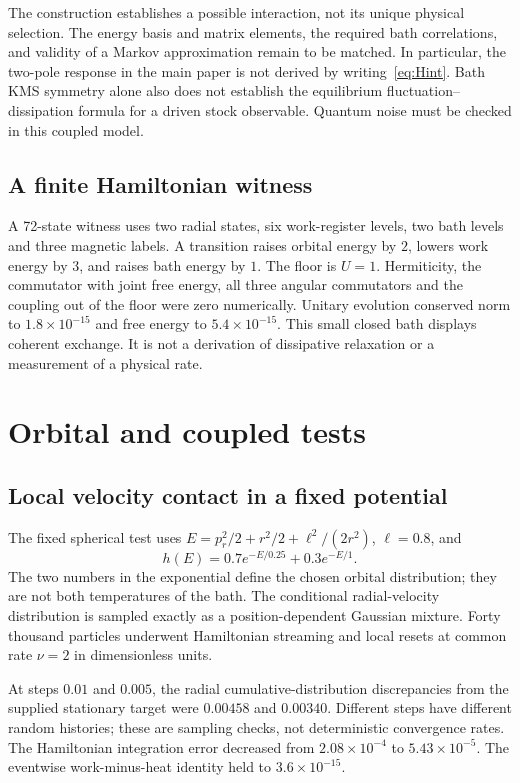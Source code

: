 \documentclass[11pt]{article}
\begin{document}
The construction establishes a possible interaction, not its unique
physical selection. The energy basis and matrix elements, the required
bath correlations, and validity of a Markov approximation remain to be
matched. In particular, the two-pole response in the main paper is not
derived by writing~\eqref{eq:Hint}. Bath KMS symmetry alone also does not
establish the equilibrium fluctuation--dissipation formula for a driven
stock observable. Quantum noise must be checked in this coupled model.

\subsection{A finite Hamiltonian witness}
A 72-state witness uses two radial states, six work-register levels, two
bath levels and three magnetic labels. A transition raises orbital energy
by $2$, lowers work energy by $3$, and raises bath energy by $1$. The
floor is $U=1$. Hermiticity, the commutator with joint free energy, all
three angular commutators and the coupling out of the floor were zero
numerically. Unitary evolution conserved norm to $1.8\times10^{-15}$ and
free energy to $5.4\times10^{-15}$.
This small closed bath displays coherent exchange. It is not a derivation
of dissipative relaxation or a measurement of a physical rate.

\section{Orbital and coupled tests}
\subsection{Local velocity contact in a fixed potential}
The fixed spherical test uses
$E=p_r^2/2+r^2/2+\ell^2/(2r^2)$, $\ell=0.8$, and
\begin{equation}
 h(E)=0.7e^{-E/0.25}+0.3e^{-E/1}.
\end{equation}
The two numbers in the exponential define the chosen orbital distribution;
they are not both temperatures of the bath. The conditional radial-velocity
distribution is sampled exactly as a position-dependent Gaussian mixture.
Forty thousand particles underwent Hamiltonian streaming and local resets
at common rate $\nu=2$ in dimensionless units.

At steps $0.01$ and $0.005$, the radial cumulative-distribution discrepancies
from the supplied stationary target were $0.00458$ and $0.00340$.
Different steps have different random histories; these are sampling checks,
not deterministic convergence rates. The Hamiltonian integration error
decreased from $2.08\times10^{-4}$ to $5.43\times10^{-5}$. The eventwise
work-minus-heat identity held to $3.6\times10^{-15}$.
\end{document}
